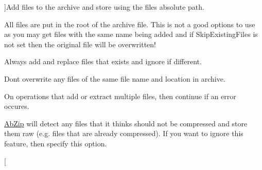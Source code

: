 \begin{Desc}
\begin{description}
{}]Add files to the archive and store using the files absolute path. \item[{\em 
Add\+Ignore\+Paths\hypertarget{class_ab_zip_a9c4f57d6b8d9a449c2eb6c4d4e53c9d5a1525b553c7ec40d3a51e30731b8e84b0}{}\label{class_ab_zip_a9c4f57d6b8d9a449c2eb6c4d4e53c9d5a1525b553c7ec40d3a51e30731b8e84b0}
}]All files are put in the root of the archive file. This is not a good options to use as you may get files with the same name being added and if Skip\+Existing\+Files is not set then the original file will be overwritten! \item[{\em 
Add\+Replace\+Files\hypertarget{class_ab_zip_a9c4f57d6b8d9a449c2eb6c4d4e53c9d5a1fcbc789293975fb30038ef333269744}{}\label{class_ab_zip_a9c4f57d6b8d9a449c2eb6c4d4e53c9d5a1fcbc789293975fb30038ef333269744}
}]Always add and replace files that exists and ignore if different. \item[{\em 
Skip\+Existing\+Files\hypertarget{class_ab_zip_a9c4f57d6b8d9a449c2eb6c4d4e53c9d5a19424543923204da4ee787ecacd9209b}{}\label{class_ab_zip_a9c4f57d6b8d9a449c2eb6c4d4e53c9d5a19424543923204da4ee787ecacd9209b}
}]Don\textquotesingle{}t overwrite any files of the same file name and location in archive. \item[{\em 
Continue\+On\+Error\hypertarget{class_ab_zip_a9c4f57d6b8d9a449c2eb6c4d4e53c9d5a8da32dae1589f05f6e1eaf2a77353542}{}\label{class_ab_zip_a9c4f57d6b8d9a449c2eb6c4d4e53c9d5a8da32dae1589f05f6e1eaf2a77353542}
}]On operations that add or extract multiple files, then continue if an error occures. \item[{\em 
Ignore\+Store\+Only\+Checks\hypertarget{class_ab_zip_a9c4f57d6b8d9a449c2eb6c4d4e53c9d5ade267877085e03c98076fe12ce440440}{}\label{class_ab_zip_a9c4f57d6b8d9a449c2eb6c4d4e53c9d5ade267877085e03c98076fe12ce440440}
}]\hyperlink{class_ab_zip}{Ab\+Zip} will detect any files that it thinks should not be compressed and store them raw (e.\+g. files that are already compressed). If you want to ignore this feature, then specify this option. \item[{\em 
}
\end{description}
\end{Desc}
